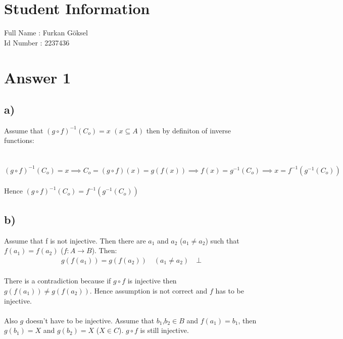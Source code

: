 \documentclass[12pt]{article}
\begin{document}
\section*{Student Information } 
Full Name : Furkan Göksel \\
Id Number : 2237436 \\

\section*{Answer 1}
\subsection*{a)}
Assume that $(g \circ f)^{-1}(C_o) = x$ $(x \subseteq A)$ then by definiton of inverse functions: \\ \\ \\
$(g\circ f)^{-1}(C_o) = x \implies C_o = (g\circ f)(x) = g(f(x))  \implies f(x) = g^{-1}(C_o) \implies x = f^{-1}(g^{-1}(C_o))$ \\ \\

Hence $(g \circ f)^{-1}(C_o) = f^{-1}(g^{-1}(C_o))$
\subsection*{b)}
Assume that f is not injective. Then there are $a_1$ and $a_2$ ($a_1 \neq a_2$) such that $f(a_1) = f(a_2)$ ($f: A\to B$). Then: 
\begin{equation} 
\label{eq2}
\begin{split}
    g(f(a_1)) = g(f(a_2))\quad  (a_1 \neq a_2) \quad \bot
\end{split}
\end{equation} \\
There is a contradiction because if $g\circ f$ is injective then $g(f(a_1)) \neq g(f(a_2))$. Hence assumption is not correct and $f$ has to be injective. \\ \\
Also $g$ doesn't have to be injective. Assume that $b_1$,$b_2 \in B$ and $f(a_1) = b_1$, then $g(b_1)=X$ and $g(b_2)=X$ ($X \in C$). $g \circ f$ is still injective.
\end{document}
